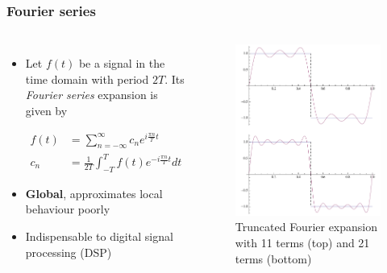 \documentclass{beamer}
\begin{document}
\begin{frame}
\frametitle{Fourier series}
\begin{columns}[c]
\begin{itemize}
	\item Let $f(t)$ be a signal in the time domain with period $2T$. Its 
		\textit{Fourier series} expansion is given by

		\begin{align}
			f(t)	&= \sum_{n=-\infty}^{\infty} c_n e^{i \frac{\pi n}{T} t} \\
			c_n		&= \frac{1}{2T} \int_{-T}^{T} f(t) e^{-i \frac{\pi n}{T} t} dt
		\end{align}
	\item \textbf{Global}, approximates local behaviour poorly
	\item Indispensable to digital signal processing (DSP)
\end{itemize}
\begin{figure} %
\centering
	\includegraphics[width=\columnwidth]{../figures/fourier}
\caption{Truncated Fourier expansion with 11 terms (top) and 21 terms (bottom)}
\end{figure}
\end{columns}
\end{frame}
\end{document}
